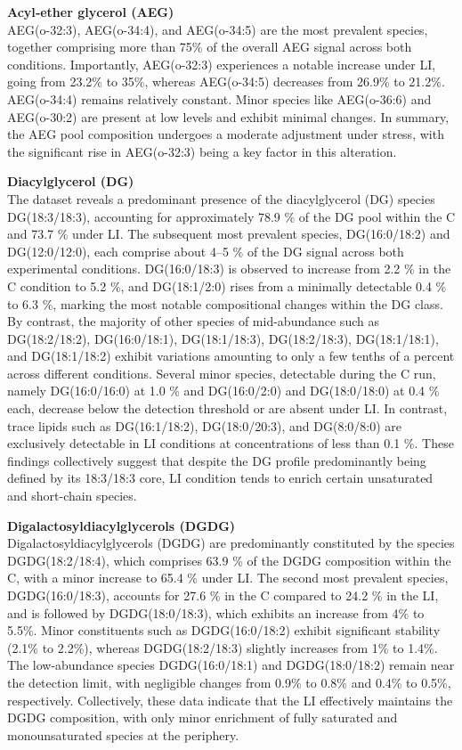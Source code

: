 \documentclass[10pt,letterpaper]{article}
\begin{document}
\bigskip
\textbf{Acyl‐ether glycerol (AEG)}  \\
AEG(o-32:3), AEG(o-34:4), and AEG(o-34:5) are the most prevalent species, together comprising more than 75\% of the overall AEG signal across both conditions. Importantly, AEG(o-32:3) experiences a notable increase under LI, going from 23.2\% to 35\%, whereas AEG(o-34:5) decreases from 26.9\% to 21.2\%. AEG(o-34:4) remains relatively constant. Minor species like AEG(o-36:6) and AEG(o-30:2) are present at low levels and exhibit minimal changes. In summary, the AEG pool composition undergoes a moderate adjustment under stress, with the significant rise in AEG(o-32:3) being a key factor in this alteration.

\textbf{Diacylglycerol (DG)}  \\
The dataset reveals a predominant presence of the diacylglycerol (DG) species DG(18:3/18:3), accounting for approximately 78.9 \% of the DG pool within the C and 73.7 \% under LI. The subsequent most prevalent species, DG(16:0/18:2) and DG(12:0/12:0), each comprise about 4–5 \% of the DG signal across both experimental conditions. DG(16:0/18:3) is observed to increase from 2.2 \% in the C condition to 5.2 \%, and DG(18:1/2:0) rises from a minimally detectable 0.4 \% to 6.3 \%, marking the most notable compositional changes within the DG class. By contrast, the majority of other species of mid-abundance such as DG(18:2/18:2), DG(16:0/18:1), DG(18:1/18:3), DG(18:2/18:3), DG(18:1/18:1), and DG(18:1/18:2) exhibit variations amounting to only a few tenths of a percent across different conditions. Several minor species, detectable during the C run, namely DG(16:0/16:0) at 1.0 \% and DG(16:0/2:0) and DG(18:0/18:0) at 0.4 \% each, decrease below the detection threshold or are absent under LI. In contrast, trace lipids such as DG(16:1/18:2), DG(18:0/20:3), and DG(8:0/8:0) are exclusively detectable in LI conditions at concentrations of less than 0.1 \%. These findings collectively suggest that despite the DG profile predominantly being defined by its 18:3/18:3 core, LI condition tends to enrich certain unsaturated and short-chain species.


\textbf{Digalactosyldiacylglycerols (DGDG)}  \\
Digalactosyldiacylglycerols (DGDG) are predominantly constituted by the species DGDG(18:2/18:4), which comprises 63.9 \% of the DGDG composition within the C, with a minor increase to 65.4 \% under LI. The second most prevalent species, DGDG(16:0/18:3), accounts for 27.6 \% in the C  compared to 24.2 \% in the LI, and is followed by DGDG(18:0/18:3), which exhibits an increase from 4\% to 5.5\%. Minor constituents such as DGDG(16:0/18:2) exhibit significant stability (2.1\% to 2.2\%), whereas DGDG(18:2/18:3) slightly increases from 1\% to 1.4\%. The low-abundance species DGDG(16:0/18:1) and DGDG(18:0/18:2) remain near the detection limit, with negligible changes from 0.9\% to 0.8\% and 0.4\% to 0.5\%, respectively. Collectively, these data indicate that the LI effectively maintains the DGDG composition, with only minor enrichment of fully saturated and monounsaturated species at the periphery.
\end{document}
